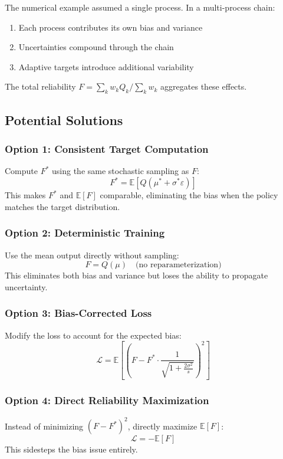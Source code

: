\documentclass[11pt,a4paper]{article}
\theoremstyle{definition}
\newcommand{\E}{\mathbb{E}}
\begin{document}
The numerical example assumed a single process. In a multi-process chain:

\begin{enumerate}
    \item Each process contributes its own bias and variance
    \item Uncertainties compound through the chain
    \item Adaptive targets introduce additional variability
\end{enumerate}

The total reliability $F = \sum_k w_k Q_k / \sum_k w_k$ aggregates these effects.

\subsection{Potential Solutions}

\subsubsection{Option 1: Consistent Target Computation}
Compute $F^*$ using the same stochastic sampling as $F$:
\begin{equation}
    F^* = \E\left[Q(\mu^* + \sigma^*\varepsilon)\right]
\end{equation}
This makes $F^*$ and $\E[F]$ comparable, eliminating the bias when the policy matches the target distribution.

\subsubsection{Option 2: Deterministic Training}
Use the mean output directly without sampling:
\begin{equation}
    F = Q(\mu) \quad \text{(no reparameterization)}
\end{equation}
This eliminates both bias and variance but loses the ability to propagate uncertainty.

\subsubsection{Option 3: Bias-Corrected Loss}
Modify the loss to account for the expected bias:
\begin{equation}
    \mathcal{L} = \E\left[\left(F - F^* \cdot \frac{1}{\sqrt{1 + \frac{2\sigma^2}{s}}}\right)^2\right]
\end{equation}

\subsubsection{Option 4: Direct Reliability Maximization}
Instead of minimizing $(F - F^*)^2$, directly maximize $\E[F]$:
\begin{equation}
    \mathcal{L} = -\E[F]
\end{equation}
This sidesteps the bias issue entirely.
\end{document}
